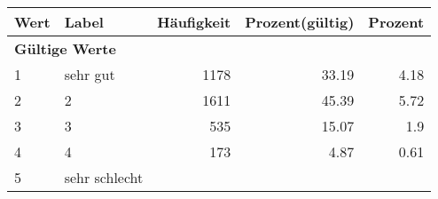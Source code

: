      \begin{longtable}{lXrrr}
     \toprule
     \textbf{Wert} & \textbf{Label} & \textbf{Häufigkeit} & \textbf{Prozent(gültig)} & \textbf{Prozent} \\
     \endhead
     \midrule
     \multicolumn{5}{l}{\textbf{Gültige Werte}}\\

     1 &
     \multicolumn{1}{X}{ sehr gut   } &


       \num{1178} &
       \num[round-mode=places,round-precision=2]{33.19} &
         \num[round-mode=places,round-precision=2]{4.18} \\

     2 &
     \multicolumn{1}{X}{ 2   } &


       \num{1611} &
       \num[round-mode=places,round-precision=2]{45.39} &
         \num[round-mode=places,round-precision=2]{5.72} \\

     3 &
     \multicolumn{1}{X}{ 3   } &


       \num{535} &
       \num[round-mode=places,round-precision=2]{15.07} &
         \num[round-mode=places,round-precision=2]{1.9} \\

     4 &
     \multicolumn{1}{X}{ 4   } &


       \num{173} &
       \num[round-mode=places,round-precision=2]{4.87} &
         \num[round-mode=places,round-precision=2]{0.61} \\

     5 &
     \multicolumn{1}{X}{ sehr schlecht   } &



\end{longtable}
